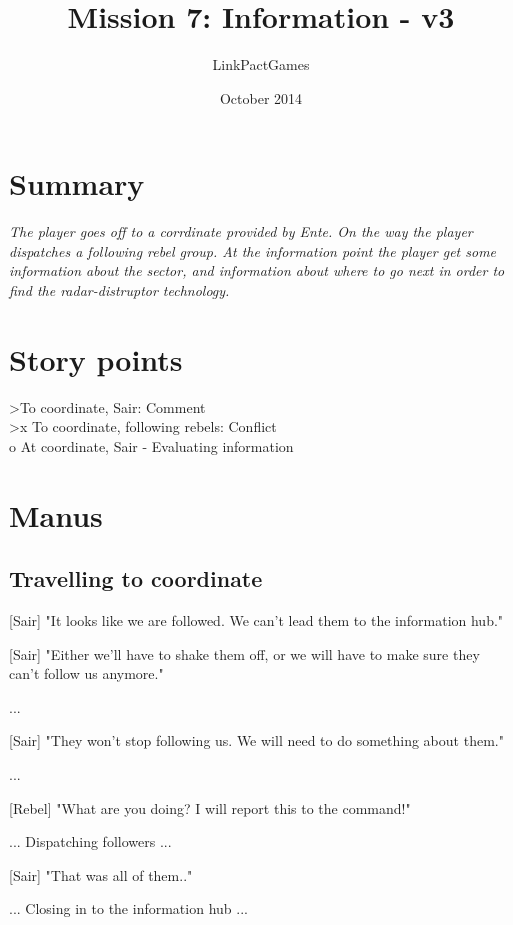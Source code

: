 \documentclass[a4paper,12pt]{article}
\begin{document}
\title{Mission 7: Information - v3}
\author{LinkPactGames}
\date{October 2014}
\maketitle

\section{Summary}

\textit{The player goes off to a corrdinate provided by Ente. On the way the player dispatches a following rebel group.
At the information point the player get some information about the sector, and information about where to go next
in order to find the radar-distruptor technology.}

\section{Story points}

\textgreater To coordinate, Sair: Comment\\
\textgreater x To coordinate, following rebels: Conflict\\
o At coordinate, Sair - Evaluating information

\section{Manus}

\subsection{Travelling to coordinate}

[Sair] "It looks like we are followed. We can't lead them to the information hub." 

[Sair] "Either we'll have to shake them off, or we will have to make sure they can't follow us anymore."

...

[Sair] "They won't stop following us. We will need to do something about them."

...

[Rebel] "What are you doing? I will report this to the command!"

... Dispatching followers ...

[Sair] "That was all of them.."

... Closing in to the information hub ...
\end{document}
